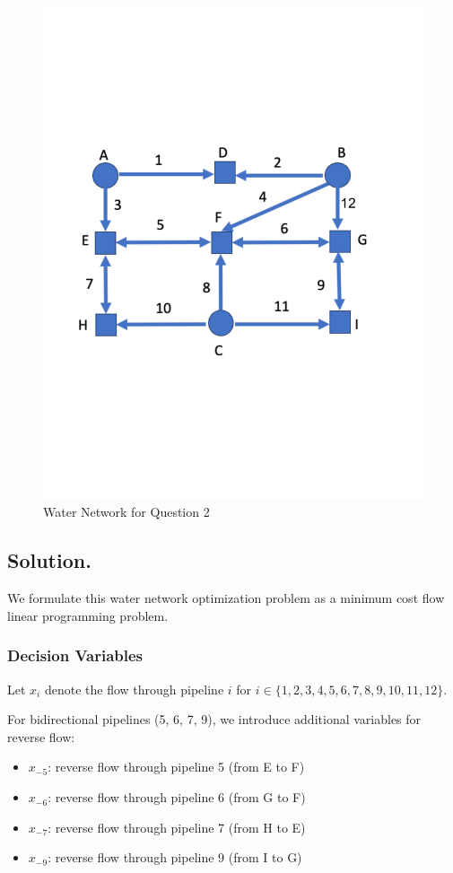 \documentclass[11pt]{article}
\begin{document}
\begin{enumerate}
\begin{figure}[h!]
    \centering
    \includegraphics[scale=0.5]{newwaterfig.pdf}
    \caption{Water Network for Question 2}
    \label{fig:water}
\end{figure}

\subsection*{Solution.}

We formulate this water network optimization problem as a minimum cost flow linear programming problem.

\subsubsection*{Decision Variables}
Let $x_i$ denote the flow through pipeline $i$ for $i \in \{1, 2, 3, 4, 5, 6, 7, 8, 9, 10, 11, 12\}$.

For bidirectional pipelines (5, 6, 7, 9), we introduce additional variables for reverse flow:
\begin{itemize}
    \item $x_{-5}$: reverse flow through pipeline 5 (from E to F)
    \item $x_{-6}$: reverse flow through pipeline 6 (from G to F)  
    \item $x_{-7}$: reverse flow through pipeline 7 (from H to E)
    \item $x_{-9}$: reverse flow through pipeline 9 (from I to G)
\end{itemize}


\end{enumerate}
\end{document}
